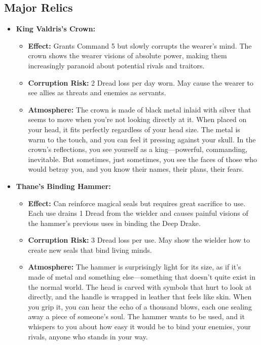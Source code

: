 \documentclass[11pt]{article}
\begin{document}
\subsection{Major Relics}
\begin{itemize}
\item \textbf{King Valdris's Crown:} 
  \begin{itemize}
  \item \textbf{Effect:} Grants Command 5 but slowly corrupts the wearer's mind. The crown shows the wearer visions of absolute power, making them increasingly paranoid about potential rivals and traitors.
  \item \textbf{Corruption Risk:} 2 Dread loss per day worn. May cause the wearer to see allies as threats and enemies as servants.
  \item \textbf{Atmosphere:} The crown is made of black metal inlaid with silver that seems to move when you're not looking directly at it. When placed on your head, it fits perfectly regardless of your head size. The metal is warm to the touch, and you can feel it pressing against your skull. In the crown's reflections, you see yourself as a king—powerful, commanding, inevitable. But sometimes, just sometimes, you see the faces of those who would betray you, and you know their names, their plans, their fears.
  \end{itemize}
\item \textbf{Thane's Binding Hammer:} 
  \begin{itemize}
  \item \textbf{Effect:} Can reinforce magical seals but requires great sacrifice to use. Each use drains 1 Dread from the wielder and causes painful visions of the hammer's previous uses in binding the Deep Drake.
  \item \textbf{Corruption Risk:} 3 Dread loss per use. May show the wielder how to create new seals that bind living minds.
  \item \textbf{Atmosphere:} The hammer is surprisingly light for its size, as if it's made of metal and something else—something that doesn't quite exist in the normal world. The head is carved with symbols that hurt to look at directly, and the handle is wrapped in leather that feels like skin. When you grip it, you can hear the echo of a thousand blows, each one sealing away a piece of someone's soul. The hammer wants to be used, and it whispers to you about how easy it would be to bind your enemies, your rivals, anyone who stands in your way.
  \end{itemize}

\end{itemize}
\end{document}
